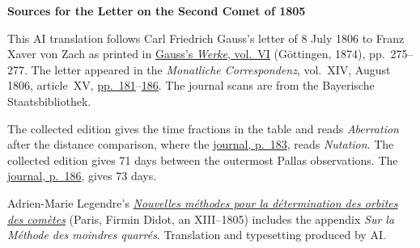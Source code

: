 \clearpage\thispagestyle{empty}
\begin{center}\textbf{Sources for the Letter on the Second Comet of 1805}\end{center}
\noindent This AI translation follows Carl Friedrich Gauss’s letter of 8 July 1806 to Franz Xaver von Zach as printed in \href{https://gdz.sub.uni-goettingen.de/id/PPN236007467}{Gauss’s \textit{Werke}, vol.~VI} (Göttingen, 1874), pp.~275--277. The letter appeared in the \textit{Monatliche Correspondenz}, vol.~XIV, August 1806, article~XV, \href{https://www.digitale-sammlungen.de/en/view/bsb10538606?page=195}{pp.~181}--\href{https://www.digitale-sammlungen.de/en/view/bsb10538606?page=200}{186}. The journal scans are from the Bayerische Staatsbibliothek.
\par\medskip
The collected edition gives the time fractions in the table and reads \textit{Aberration} after the distance comparison, where the \href{https://www.digitale-sammlungen.de/en/view/bsb10538606?page=197}{journal, p.~183}, reads \textit{Nutation}. The collected edition gives 71 days between the outermost Pallas observations. The \href{https://www.digitale-sammlungen.de/en/view/bsb10538606?page=200}{journal, p.~186}, gives 73 days.
\par\medskip
Adrien-Marie Legendre’s \href{https://www.e-rara.ch/zut/content/titleinfo/10838079}{\textit{Nouvelles méthodes pour la détermination des orbites des comètes}} (Paris, Firmin Didot, an XIII--1805) includes the appendix \textit{Sur la Méthode des moindres quarrés}. Translation and typesetting produced by AI.
\clearpage
